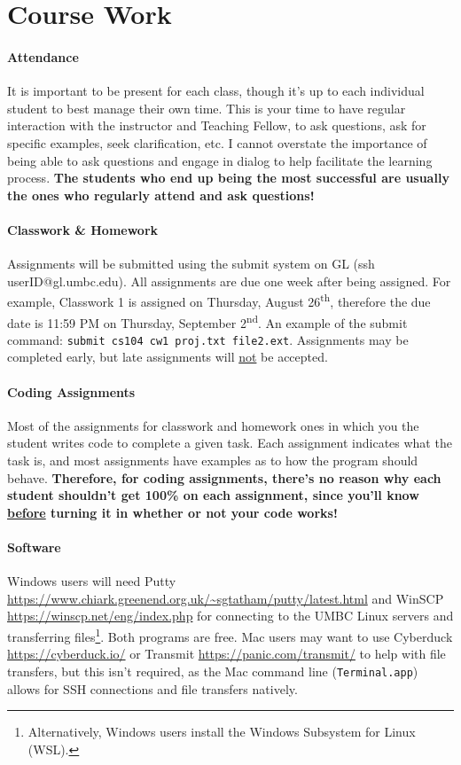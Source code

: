 \documentclass[letter,11pt]{article}
\begin{document}
\section*{Course Work}
\paragraph{Attendance}It is important to be present for each class, though it's up to each individual student to best manage their own time. This is your time to have regular interaction with the instructor and Teaching Fellow, to ask questions, ask for specific examples, seek clarification, etc. I cannot overstate the importance of being able to ask questions and engage in dialog to help facilitate the learning process. \textbf{The students who end up being the most successful are usually the ones who regularly attend and ask questions!}

\paragraph{Classwork \& Homework}Assignments will be submitted using the submit system on GL (ssh userID@gl.umbc.edu). All assignments are due one week after being assigned. For example, Classwork 1 is assigned on Thursday, August 26\textsuperscript{th}, therefore the due date is 11:59 PM on Thursday, September 2\textsuperscript{nd}. An example of the submit command: \texttt{submit cs104 cw1 proj.txt file2.ext}. Assignments may be completed early, but late assignments will \underline{not} be accepted.

\paragraph{Coding Assignments}Most of the assignments for classwork and homework ones in which you the student writes code to complete a given task. Each assignment indicates what the task is, and most assignments have examples as to how the program should behave. \textbf{Therefore, for coding assignments, there's no reason why each student shouldn't get 100\% on each assignment, since you'll know \underline{before} turning it in whether or not your code works!}

\paragraph{Software} Windows users will need Putty \url{https://www.chiark.greenend.org.uk/~sgtatham/putty/latest.html} and WinSCP \url{https://winscp.net/eng/index.php} for connecting to the UMBC Linux servers and transferring files\footnote{Alternatively, Windows users install the Windows Subsystem for Linux (WSL).}. Both programs are free. Mac users may want to use Cyberduck \url{https://cyberduck.io/} or Transmit \url{https://panic.com/transmit/} to help with file transfers, but this isn't required, as the Mac command line (\texttt{Terminal.app}) allows for SSH connections and file transfers natively.
\end{document}
